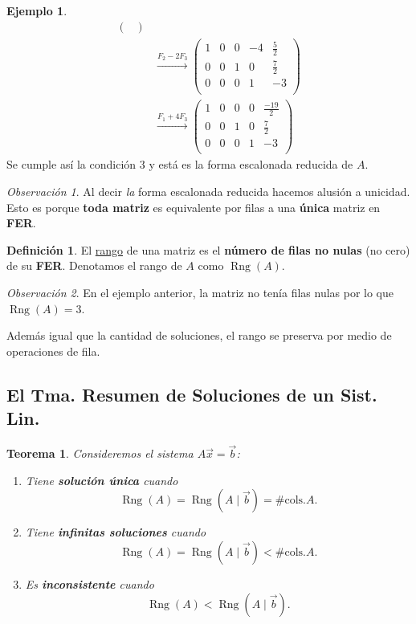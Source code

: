 \documentclass[12pt]{article}
\theoremstyle{plain}
\newtheorem*{nTh}{Teorema}             %
\theoremstyle{definition}
\newtheorem*{Def}{Definición}       %
\newtheorem{Ex}[Th]{Ejemplo}           %
\theoremstyle{remark}
\newtheorem*{Rmk}{Observación}      %
\DeclareMathOperator{\Rng}{Rng}     %
\renewcommand{\:}{\colon}           %
\newcommand{\un}[1]{\underline{#1}}
\begin{document}
\begin{multicols}{2}
\begin{Ex}
\begin{align*}
\begin{pmatrix}
  \end{pmatrix}\\
  &\xrightarrow[]{F_2-2F_3} \begin{pmatrix}
      1&0&0&-4&\frac{5}{2}\\ 0&0&1&0&\frac{7}{2}\\ 0&0&0&1&-3\\
\end{pmatrix}\\
&\xrightarrow[]{F_1+4F_3} \begin{pmatrix}
  1&0&0&0&\frac{-19}{2}\\ 0&0&1&0&\frac{7}{2}\\ 0&0&0&1&-3\\\end{pmatrix}
  \end{align*}
  Se cumple así la condición 3 y está es la forma escalonada reducida de $A$.
\end{Ex}

\begin{Rmk}
  Al decir \emph{la} forma escalonada reducida hacemos alusión a unicidad. Esto es porque \textbf{toda matriz} es equivalente por filas a una \textbf{única} matriz en \textbf{FER}.
\end{Rmk}

\begin{Def}
  El \un{rango} de una matriz es el \textbf{número de filas no nulas} (no cero) de su \textbf{FER}. Denotamos el rango de $A$ como $\Rng(A)$.
\end{Def}

\begin{Rmk}
  En el ejemplo anterior, la matriz no tenía filas nulas por lo que $\Rng(A)=3$.\par 
  Además igual que la cantidad de soluciones, el rango se preserva por medio de operaciones de fila.
\end{Rmk}

\subsection*{El Tma. Resumen de Soluciones de un Sist. Lin.}

\begin{nTh}
Consideremos el sistema $A\vec{x}=\vec{b}$:
\begin{enumerate}
  \item Tiene \textbf{solución única} cuando
  $$ \Rng(A)=\Rng(A\mid\vec b)=\#\text{cols.} A.$$
  \item Tiene \textbf{infinitas soluciones} cuando
  $$ \Rng(A)=\Rng(A\mid\vec b)<\#\text{cols.} A.$$
  \item Es \textbf{inconsistente} cuando 
 $$\Rng(A)<\Rng(A\mid\vec b).$$
\end{enumerate}
\end{nTh}


\end{multicols}
\end{document}
